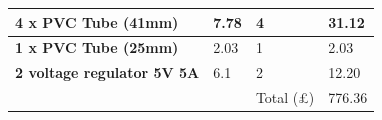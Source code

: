 \documentclass[11pt,landscape]{article}
\begin{document}
\begin{table}[H]
\begin{center}
\begin{tabular}{|l|l|l|l|}
    \textbf{4 x PVC Tube (41mm)}                                                      & 7.78                                          & 4                                     & 31.12                                                 \\ \hline
    \textbf{1 x PVC Tube (25mm)}                                                      & 2.03                                          & 1                                     & 2.03                                                  \\ \hline
    \textbf{2 voltage regulator 5V 5A}                                                 & 6.1                                           & 2                                     & 12.20                                                 \\ \hline
                                                                                      &                                               & Total (£)                             & 776.36 \\ \hline
    \end{tabular}
\end{center}
\end{table}
\end{document}

